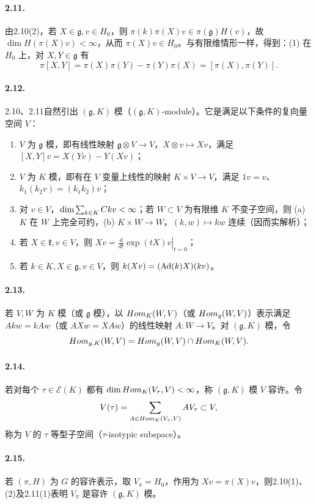 \paragraph*{2.11.} 由2.10(2)，若 $X\in\mathfrak g,v\in H_0$，则 $\pi(k)\pi(X)v\in\pi(\mathfrak g)H(v)$，故 $\dim H(\pi(X)v)<\infty$，从而 $\pi(X)v\in H_0$。与有限维情形一样，得到：(1) 在 $H_0$ 上，对 $X,Y\in\mathfrak g$ 有
\[
 \pi[X,Y]=\pi(X)\pi(Y)-\pi(Y)\pi(X)=[\pi(X),\pi(Y)].
\]
\paragraph*{2.12.} 2.10、2.11自然引出 $(\mathfrak g,K)$ 模（$(\mathfrak g,K)$-module）。它是满足以下条件的复向量空间 $V$：
\begin{enumerate}
\item[(1)] $V$ 为 $\mathfrak g$ 模，即有线性映射 $\mathfrak g\otimes V\to V$，$X\otimes v\mapsto Xv$，满足 $[X,Y]v=X(Yv)-Y(Xv)$；
\item[(2)] $V$ 为 $K$ 模，即有在 $V$ 变量上线性的映射 $K\times V\to V$，满足 $1v=v$、$k_1(k_2v)=(k_1k_2)v$；
\item[(3)] 对 $v\in V$，$\dim\sum_{k\in K}C kv<\infty$；若 $W\subset V$ 为有限维 $K$ 不变子空间，则 (a) $K$ 在 $W$ 上完全可约，(b) $K\times W\to W$，$(k,w)\mapsto kw$ 连续（因而实解析）；
\item[(4)] 若 $X\in\mathfrak k,v\in V$，则 $Xv=\left.\frac d{dt}\exp(tX)v\right|_{t=0}$；
\item[(5)] 若 $k\in K,X\in\mathfrak g,v\in V$，则 $k(Xv)=(\operatorname{Ad}(k)X)(kv)$。
\end{enumerate}
\paragraph*{2.13.} 若 $V,W$ 为 $K$ 模（或 $\mathfrak g$ 模），以 $Hom_K(W,V)$（或 $Hom_{g}(W,V)$）表示满足 $Akw=kAw$（或 $AXw=XAw$）的线性映射 $A:W\to V$。对 $(\mathfrak g,K)$ 模，令
\[
 Hom_{g,K}(W,V)=Hom_{g}(W,V)\cap Hom_K(W,V).
\]
\paragraph*{2.14.} 若对每个 $\tau\in\mathcal E(K)$ 都有 $\dim Hom_K(V_\tau,V)<\infty$，称 $(\mathfrak g,K)$ 模 $V$ 容许。令
\[
 V(\tau)=\sum_{A\in Hom_K(V_\tau,V)}AV_\tau\subset V,
\]
称为 $V$ 的 $\tau$ 等型子空间（$\tau$-isotypic subspace）。
\paragraph*{2.15.} 若 $(\pi,H)$ 为 $G$ 的容许表示，取 $V_\pi=H_0$，作用为 $Xv=\pi(X)v$，则2.10(1)、(2)及2.11(1)表明 $V_\pi$ 是容许 $(\mathfrak g,K)$ 模。
